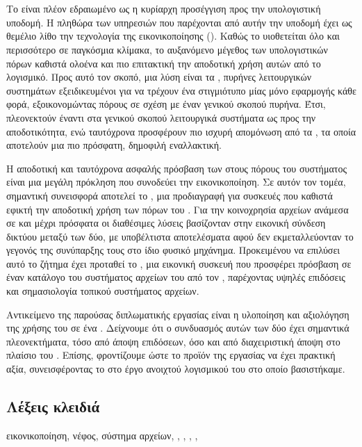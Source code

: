 \chapter*{\abstractname}

Το  είναι πλέον εδραιωμένο ως η κυρίαρχη προσέγγιση προς την
υπολογιστική υποδομή. Η πληθώρα των υπηρεσιών που παρέχονται από αυτήν την
υποδομή έχει ως θεμέλιο λίθο την τεχνολογία της εικονικοποίησης
(). Καθώς το  υιοθετείται όλο και περισσότερο σε
παγκόσμια κλίμακα, το αυξανόμενο μέγεθος των υπολογιστικών πόρων καθιστά
ολοένα και πιο επιτακτική την αποδοτική χρήση αυτών από το λογισμικό. Προς αυτό
τον σκοπό, μια λύση είναι τα \emph{}, πυρήνες λειτουργικών
συστημάτων εξειδικευμένοι για να τρέχουν ένα στιγμιότυπο μίας μόνο εφαρμογής
κάθε φορά, εξοικονομώντας πόρους σε σχέση με έναν γενικού σκοπού πυρήνα. Έτσι,
πλεονεκτούν έναντι στα γενικού σκοπού λειτουργικά συστήματα ως προς την
αποδοτικότητα, ενώ ταυτόχρονα προσφέρουν πιο ισχυρή απομόνωση από τα
, τα οποία αποτελούν μια πιο πρόσφατη, δημοφιλή εναλλακτική.

Η αποδοτική και ταυτόχρονα ασφαλής πρόσβαση των  στους
πόρους του  συστήματος είναι μια μεγάλη πρόκληση που συνοδεύει την
εικονικοποίηση. Σε αυτόν τον τομέα, σημαντική συνεισφορά αποτελεί το
\emph{}, μια προδιαγραφή για  συσκευές που
καθιστά εφικτή την αποδοτική χρήση των πόρων του . Για την κοινοχρησία
αρχείων ανάμεσα σε  και  μέχρι πρόσφατα οι διαθέσιμες λύσεις
βασίζονταν στην εικονική σύνδεση δικτύου μεταξύ των δύο, με υποβέλτιστα
αποτελέσματα αφού δεν εκμεταλλεύονταν το γεγονός της συνύπαρξης τους στο ίδιο
φυσικό μηχάνημα. Προκειμένου να επιλύσει αυτό το ζήτημα έχει προταθεί το
\emph{}, μια εικονική  συσκευή που προσφέρει πρόσβαση
σε έναν κατάλογο του συστήματος αρχείων του  από τον ,
παρέχοντας υψηλές επιδόσεις και σημασιολογία τοπικού συστήματος αρχείων.

Αντικείμενο της παρούσας διπλωματικής εργασίας είναι η υλοποίηση και αξιολόγηση
της χρήσης του  σε ένα . Δείχνουμε ότι ο συνδυασμός
αυτών των δύο έχει σημαντικά πλεονεκτήματα, τόσο από άποψη επιδόσεων, όσο και
από διαχειριστική άποψη στο πλαίσιο του . Επίσης, φροντίζουμε ώστε το
προϊόν της εργασίας να έχει πρακτική αξία, συνεισφέροντας το στο έργο ανοιχτού
λογισμικού του  στο οποίο βασιστήκαμε.

\section*{Λέξεις κλειδιά}
\noindent
εικονικοποίηση, νέφος, σύστημα αρχείων, , , ,
, 
